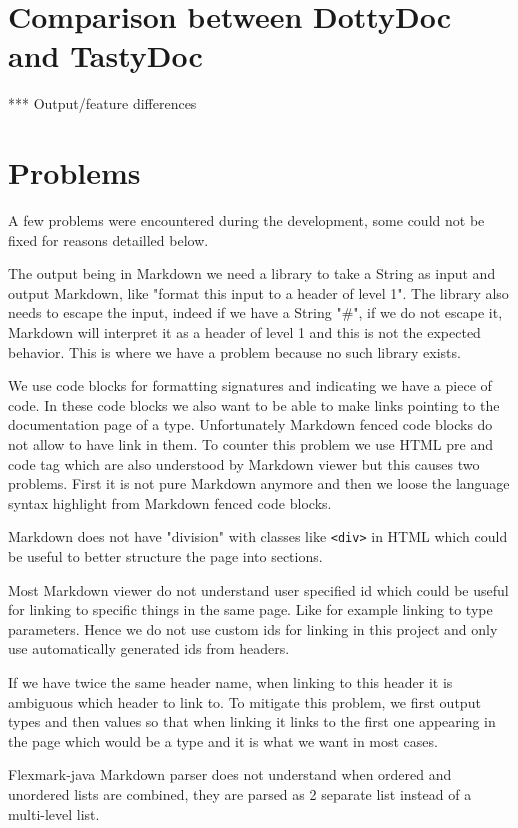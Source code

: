 \documentclass{report}
\begin{document}
\chapter{Comparison between DottyDoc and TastyDoc}
*** Output/feature differences

\chapter{Problems}
A few problems were encountered during the development, some could not be fixed for reasons detailled below.

The output being in Markdown we need a library to take a String as input and output Markdown, like "format this input to a header of level 1". The library also needs to escape the input, indeed if we have a String "\#", if we do not escape it, Markdown will interpret it as a header of level 1 and this is not the expected behavior. This is where we have a problem because no such library exists.

We use code blocks for formatting signatures and indicating we have a piece of code. In these code blocks we also want to be able to make links pointing to the documentation page of a type. Unfortunately Markdown fenced code blocks do not allow to have link in them. To counter this problem we use HTML pre and code tag which are also understood by Markdown viewer but this causes two problems. First it is not pure Markdown anymore and then we loose the language syntax highlight from Markdown fenced code blocks.

Markdown does not have "division" with classes like \texttt{<div>} in HTML which could be useful to better structure the page into sections.

Most Markdown viewer do not understand user specified id which could be useful for linking to specific things in the same page. Like for example linking to type parameters. Hence we do not use custom ids for linking in this project and only use automatically generated ids from headers.

If we have twice the same header name, when linking to this header it is ambiguous which header to link to. To mitigate this problem, we first output types and then values so that when linking it links to the first one appearing in the page which would be a type and it is what we want in most cases.

Flexmark-java Markdown parser does not understand when ordered and unordered lists are combined, they are parsed as 2 separate list instead of a multi-level list.
\end{document}
